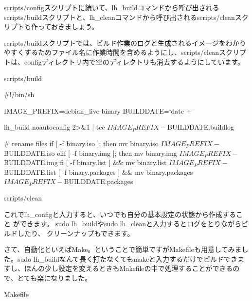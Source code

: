 \documentclass[mingoth,a4paper]{jsarticle}
\begin{document}
scripts/configスクリプトに続いて、lh\_buildコマンドから呼び出されるscripts/buildスクリプトと、lh\_cleanコマンドから呼び出されるscripts/cleanスクリプトも作っておきましょう。

scripts/buildスクリプトでは、ビルド作業のログと生成されるイメージをわかりやすくするためファイル名に作業時間を含めるようにし、scripts/cleanスクリプトは、configディレクトリ内で空のディレクトリも消去するようにしています。

scripts/build

\begin{commandline}
 #!/bin/sh

 IMAGE_PREFIX=debian_live-binary
 BUILDDATE=`date +%

 lh_build noautoconfig 2>&1 | tee ${IMAGE_PREFIX}-${BUILDDATE}.buildlog

 # rename files
 if [ -f binary.iso ]; then
    mv binary.iso ${IMAGE_PREFIX}-${BUILDDATE}.iso
 elif [ -f binary.img ]; then
    mv binary.img ${IMAGE_PREFIX}-${BUILDDATE}.img
 fi
 [ -f binary.list ] && mv binary.list ${IMAGE_PREFIX}-${BUILDDATE}.list
 [ -f binary.packages ] && mv binary.packages ${IMAGE_PREFIX}-${BUILDDATE}.packages
\end{commandline}

\newpage

scripts/clean


これでlh\_configと入力すると、いつでも自分の基本設定の状態から作成すること
ができます。
sudo lh\_buildやsudo lh\_cleanと入力するとログをとりながらビルドしたり、
クリーンナップもできます。

さて、自動化といえばMake。ということで簡単ですがMakefileも用意してみまし
た。sudo lh\_buildなんて長く打たなくてもmakeと入力するだけでビルドできま
すし、ほんの少し設定を変えるときもMakefileの中で処理することができるので、とても楽になりました。

Makefile
\end{document}
